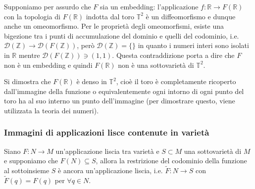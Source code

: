 Supponiamo per assurdo che $ F $ sia un embedding: l'applicazione $ f : \mathbb{R} \to F(\mathbb{R}) $ con la topologia di $ F(\mathbb{R}) $ indotta dal toro $ \mathbb{T}^{2} $ è un diffeomorfismo e dunque anche un omeomorfismo. Per le proprietà degli omeomorfismi, esiste una bigezione tra i punti di accumulazione del dominio e quelli del codominio, i.e. $ \mathcal{D}(\mathbb{Z}) \to \mathcal{D}(F(\mathbb{Z})) $, però $ \mathcal{D}(\mathbb{Z}) = \{\} $ in quanto i numeri interi sono isolati in $ \mathbb{R} $ mentre $ \mathcal{D}(F(\mathbb{Z})) \ni (1,1) $. Questa contraddizione porta a dire che $ F $ non è un embedding e quindi $ F(\mathbb{R}) $ non è una sottovarietà di $ \mathbb{T}^{2} $.

\begin{remark}
	Si dimostra che $ F(\mathbb{R}) $ è denso in $ \mathbb{T}^{2} $, cioè il toro è completamente ricoperto dall'immagine della funzione o equivalentemente ogni intorno di ogni punto del toro ha al suo interno un punto dell'immagine (per dimostrare questo, viene utilizzata la teoria dei numeri).
\end{remark}

\subsubsection{Immagini di applicazioni lisce contenute in varietà}

\begin{theorem}
	Siano $ F : N \to M $ un'applicazione liscia tra varietà e $ S \subset M $ una sottovarietà di $ M $ e supponiamo che $ F(N) \subseteq S $, allora la restrizione del codominio della funzione al sottoinsieme $ S $ è ancora un'applicazione liscia, i.e. $ \tilde{F} : N \to S $ con $ \tilde{F}(q) = F(q) $ per $ \forall q \in N $.
\end{theorem}

